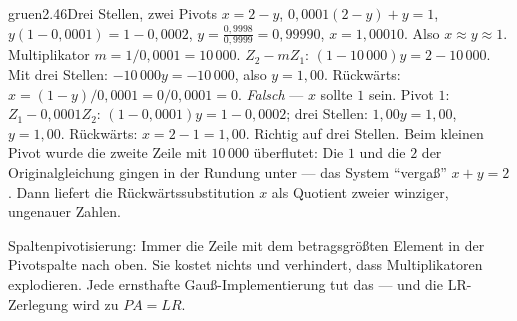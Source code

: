\begin{loesungkarte}{gruen}{2.46}{Drei Stellen, zwei Pivots}
$x = 2 - y$, $0{,}0001(2 - y) + y = 1$, $y(1 - 0{,}0001) = 1 - 0{,}0002$, $y = \frac{0{,}9998}{0{,}9999} = 0{,}99990$, $x = 1{,}00010$. Also $x\approx y\approx1$.
Multiplikator $m = 1/0{,}0001 = 10\,000$. $Z_2 - mZ_1$: $(1 - 10\,000)y = 2 - 10\,000$. Mit drei Stellen: $-10\,000y = -10\,000$, also $y = 1{,}00$. Rückwärts: $x = (1 - y)/0{,}0001 = 0/0{,}0001 = 0$. \emph{Falsch} --- $x$ sollte $1$ sein.
Pivot $1$: $Z_1 - 0{,}0001Z_2$: $(1 - 0{,}0001)y = 1 - 0{,}0002$; drei Stellen: $1{,}00y = 1{,}00$, $y = 1{,}00$. Rückwärts: $x = 2 - 1 = 1{,}00$. Richtig auf drei Stellen.
Beim kleinen Pivot wurde die zweite Zeile mit $10\,000$ überflutet: Die $1$ und die $2$ der Originalgleichung gingen in der Rundung unter --- das System \enquote{vergaß} $x + y = 2$. Dann liefert die Rückwärtssubstitution $x$ als Quotient zweier winziger, ungenauer Zahlen.
\begin{mitnehmen}\kastentext
Spaltenpivotisierung: Immer die Zeile mit dem betragsgrößten Element in der Pivotspalte nach oben. Sie kostet nichts und verhindert, dass Multiplikatoren explodieren. Jede ernsthafte Gauß-Implementierung tut das --- und die LR-Zerlegung wird zu $PA = LR$.
\end{mitnehmen}
\end{loesungkarte}

